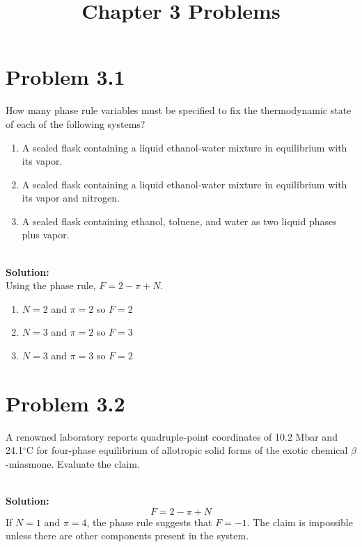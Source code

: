 \documentclass{article}
\title{Chapter 3 Problems}
\newenvironment{solution}{\par\noindent\textbf{\\Solution:\\}}{\par\medskip}
\begin{document}
\maketitle
\tableofcontents

\section*{Problem 3.1}
How many phase rule variables must be specified to fix the thermodynamic state of each of the following systems?
\begin{enumerate}[label=(\alph*)]
      \item A sealed flask containing a liquid ethanol-water mixture in equilibrium with its vapor.
      \item A sealed flask containing a liquid ethanol-water mixture in equilibrium with its vapor and nitrogen.
      \item A sealed flask containing ethanol, toluene, and water as two liquid phases plus vapor.
\end{enumerate}

\begin{solution}
      Using the phase rule, $F=2-\pi+N$.
      \begin{enumerate}[label=(\alph*)]
            \item $N=2$ and $\pi=2$ so $\boxed{ F=2 }$
            \item $N=3$ and $\pi=2$ so $\boxed{ F=3 }$
            \item $N=3$ and $\pi=3$ so $\boxed{ F=2 }$
      \end{enumerate}
\end{solution}

\section*{Problem 3.2}
A renowned laboratory reports quadruple-point coordinates of 10.2 Mbar and 24.1$^\circ$C for four-phase equilibrium of allotropic solid forms of the exotic chemical $\beta$-miasmone. Evaluate the claim.

\begin{solution}
      \begin{equation*}
            F=2-\pi+N
      \end{equation*}
      If $N=1$ and $\pi=4$, the phase rule suggests that $F=-1$. The claim is impossible unless there are other components present in the system.
\end{solution}
\end{document}
